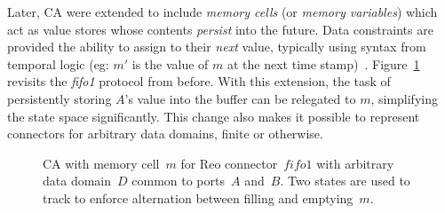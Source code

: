 Later, CA were extended to include \textit{memory cells} (or \textit{memory variables}) which act as value stores whose contents \textit{persist} into the future. Data constraints are provided the ability to assign to their \textit{next} value, typically using syntax from temporal logic (eg: $m'$ is the value of $m$ at the next time stamp)~\cite{arbab2007models}. Figure~\ref{fig:fifo1_ca_mem} revisits the \textit{fifo1} protocol from before. With this extension, the task of persistently storing $A$'s value into the buffer can be relegated to $m$, simplifying the state space significantly. This change also makes it possible to represent connectors for arbitrary data domains, finite or otherwise.



\begin{figure}[ht]
	\centering
	\caption[CA with memory for fifo1 connector.]{CA with memory cell~$m$ for Reo connector~$fifo1$ with arbitrary data domain~$D$ common to ports~$A$ and~$B$. Two states are used to track to enforce alternation between filling and emptying~$m$.}
	\label{fig:fifo1_ca_mem}
\end{figure}



